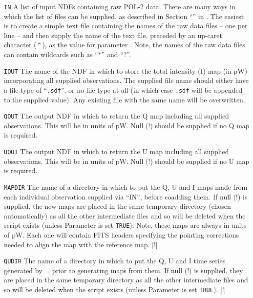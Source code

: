 \begin{aligndesc}
\item[\texttt{IN}] A list of input NDFs containing raw POL-2 data.
  There are many ways in which the list of files can be supplied, as
  described in Section ``'' in . The
  easiest is to create a simple text file containing the names of the
  raw data files -- one per line -- and then supply the name of the
  text file, preceded by an up-caret character (\,\texttt{\^{}}\,), as
  the value for parameter . Note, the names of the raw data
  files can contain wildcards such as ``$*$'' and ``?''.

\item[\texttt{IOUT}] The name of the NDF in which to store the
  total intensity (I) map (in pW) incorporating all supplied observations.
  The supplied file name should either have a file type of
  ``\texttt{.sdf}'', or no file type at all (in which case
  \texttt{.sdf} will be appended to the supplied value). Any existing
  file with the same name will be overwritten.

\item[\texttt{QOUT}] The output NDF in which to return the Q map
  including all supplied observations. This will be in units of
  pW. Null (!) should be supplied if no Q map is required.


\item[\texttt{UOUT}] The output NDF in which to return the U map
  including all supplied observations. This will be in units of
  pW. Null (!) should be supplied if no U map is required.

\item[\texttt{MAPDIR}] The name of a directory in which to put the Q,
  U and I maps made from each individual observation supplied via
  ``IN'', before coadding them. If null (!) is supplied, the new maps are
  placed in the same temporary directory (chosen automatically) as all the
  other intermediate files and so will be deleted when the script exists
  (unless Parameter  is set \texttt{TRUE}). Note, these maps are always in
  units of pW. Each one will contain FITS headers specifying the pointing
  corrections needed to align the map with the reference map. [!]


\item[\texttt{QUDIR}] The name of a directory in which to put the Q, U
  and I time series generated by \SMURF\ , prior to generating
  maps from them. If null (!) is supplied, they are placed in the same
  temporary directory as all the other intermediate files and so will
  be deleted when the script exists (unless Parameter  is set
  \texttt{TRUE}). [!]
\end{aligndesc}

